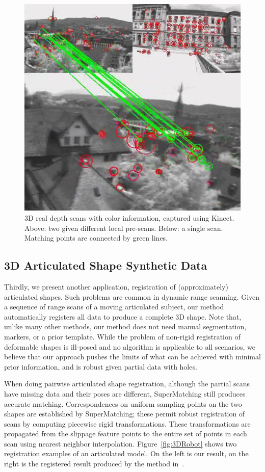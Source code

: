 \begin{figure}[h]
\centering
  \includegraphics[width=0.9\linewidth]{figures/3DReal.jpg}
  \caption{3D real depth scans with color information, captured using Kinect.
  Above: two given different local pre-scans.  Below: a single scan.
  Matching points are connected by green lines.}
\label{fig:3DReal}
\end{figure}

\subsection{3D Articulated Shape Synthetic Data}
\label{subsec:3darticulated}

Thirdly, we present another application, registration of (approximately) articulated shapes. Such problems are common in dynamic range scanning.
Given a sequence of range scans of a moving articulated subject, our method automatically registers all data to produce a complete 3D shape.
Note that, unlike many other methods, our method does not need  manual segmentation,  markers, or a prior template.
While the problem of non-rigid registration of deformable shapes is ill-posed and no algorithm is applicable to all scenarios,
we believe that our approach pushes the limits of what can be achieved with minimal prior information, and is robust given partial data with holes.

When doing pairwise articulated shape registration,
although the partial scans have missing data and their poses are different, SuperMatching still produces accurate matching.
Correspondences on uniform sampling points on the two shapes are established by SuperMatching;
these permit robust registration of scans by computing piecewise rigid transformations.
These transformations are propagated from the slippage feature points to the entire set of points in each scan using nearest neighbor interpolation.
Figure~\ref{fig:3DRobot} shows two registration examples of an articulated model. 
On the left is our result, on the right is the registered result produced by the method in~\cite{Chang09}.

